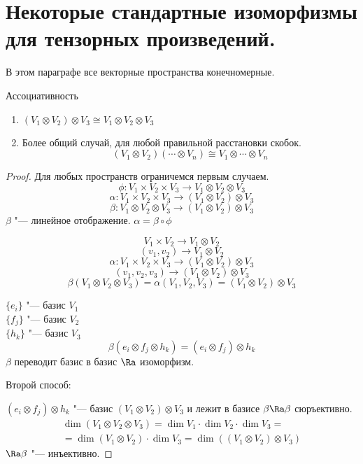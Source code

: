 ﻿\section{Некоторые стандартные изоморфизмы для тензорных произведений.}
В этом параграфе все векторные пространства конечномерные.

\begin{theorem}{Ассоциативность}
\begin{enumerate}
    \item $(V_1 \otimes V_2) \otimes V_3 \cong V_1 \otimes V_2 \otimes V_3$
    \item Более общий случай, для любой правильной расстановки скобок. 
    $$(V_1 \otimes V_2)(\cdots \otimes V_n) \cong  V_1 \otimes \cdots \otimes V_n$$
\end{enumerate}
\end{theorem}
\begin{proof}
Для любых пространств ограничемся первым случаем. 
$$\phi \colon V_1 \times V_2 \times V_3 \to V_1 \otimes V_2 \otimes V_3$$
$$\alpha \colon V_1 \times V_2 \times V_3 \to (V_1 \otimes V_2) \otimes V_3$$
$$\beta\colon V_1 \otimes V_2 \otimes V_3 \to (V_1 \otimes V_2)\otimes V_3$$
$\beta$ "--- линейное отображение. $\alpha = \beta \circ \phi$

$$V_1 \times V_2 \to V_1 \otimes V_2$$
$$(v_1, v_2) \to V_1 \otimes V_2$$
$$\alpha \colon V_1 \times V_2 \times V_3 \to (V_1 \otimes V_2) \otimes V_3$$
$$(v_1, v_2, v_3) \to  (V_1 \otimes V_2) \otimes V_3$$
$$\beta(V_1 \otimes V_2 \otimes V_3) = \alpha(V_1, V_2, V_3) = (V_1 \otimes V_2) \otimes V_3$$

$\{e_i\}$ "--- базис $V_1$\\
$\{f_j\}$ "--- базис $V_2$\\
$\{h_k\}$ "--- базис $V_3$\\
$$\beta(e_i \otimes f_j \otimes h_k) = (e_i \otimes f_j) \otimes h_k$$
$\beta$ переводит базис в базис $\Ra$ изоморфизм.

Второй способ:

$(e_i \otimes f_j) \otimes h_k$ "--- базис $(V_1 \otimes V_2) \otimes V_3$
и лежит в базисе $\beta \Ra \beta$ сюръективно.
\begin{gather*}
\dim(V_1 \otimes V_2 \otimes V_3) = \dim V_1 \cdot \dim V_2 \cdot \dim V_3 =\\
=\dim(V_1 \otimes V_2) \cdot \dim V_3 = \dim((V_1 \otimes V_2) \otimes V_3)
\end{gather*}
$\Ra \beta$ "--- инъективно. 
\end{proof}
